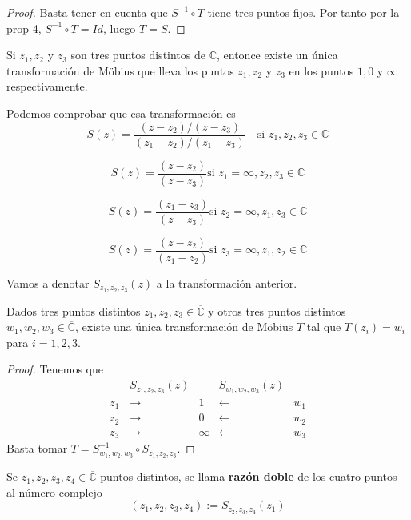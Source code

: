 \begin{proof}
    Basta tener en cuenta que $S^{-1} \circ T$ tiene tres puntos fijos. Por tanto por la prop 4, $S^{-1} \circ T = Id$, luego $T = S$.
\end{proof}

Si $z_1, z_2$ y $z_3$ son tres puntos distintos de $\overline{\mathbb{C}}$, entonce existe un única transformación de Möbius que lleva los puntos $z_1, z_2$ y $z_3$ en los puntos $1, 0$ y $\infty$ respectivamente. 

Podemos comprobar que esa transformación es 
\[
    S(z) = \frac{(z - z_2)/(z - z_3)}{(z_1 - z_2)/(z_1 - z_3)} \quad \text{si } z_1, z_2, z_3 \in \mathbb{C}
\]

\[
    S(z) = \frac{(z - z_2)}{(z - z_3)} \text{si } z_1 = \infty, z_2, z_3 \in \mathbb{C}
\]

\[
    S(z) = \frac{(z_1 - z_3)}{(z - z_3)} \text{si } z_2 = \infty, z_1, z_3 \in \mathbb{C}
\]

\[
    S(z) = \frac{(z - z_2)}{(z_1 - z_2)} \text{si } z_3 = \infty, z_1, z_2 \in \mathbb{C}
\]

Vamos a denotar $S_{z_1, z_2, z_3}(z)$ a la transformación anterior.



\begin{proposición}
    Dados tres puntos distintos $z_1, z_2, z_3 \in \overline{\mathbb{C}}$ y otros tres puntos distintos $w_1, w_2, w_3 \in \overline{\mathbb{C}}$, existe una única transformación de Möbius $T$ tal que $T(z_i) = w_i$ para $i = 1, 2, 3$. 
\end{proposición}

\begin{proof}
    Tenemos que 
    \[
        \begin{matrix}
            \quad & S_{z_1, z_2, z_3}(z) & \quad & S_{w_1, w_2, w_3}(z) & \quad \\
            z_1 & \longrightarrow & 1 & \longleftarrow & w_1 \\
            z_2 & \longrightarrow & 0 & \longleftarrow & w_2 \\
            z_3 & \longrightarrow & \infty & \longleftarrow & w_3
        \end{matrix}
    \]   
    Basta tomar $T = S_{w_1, w_2, w_3}^{-1} \circ S_{z_1, z_2, z_3}$.
\end{proof}


\begin{definición} 
    Se $z_1, z_2, z_3, z_4 \in \overline{\mathbb{C}}$ puntos distintos, se llama \textbf{razón doble} de los cuatro puntos al número complejo
    \[
        (z_1, z_2, z_3,z_4) := S_{z_2, z_3, z_4}(z_1) 
    \]
\end{definición}


